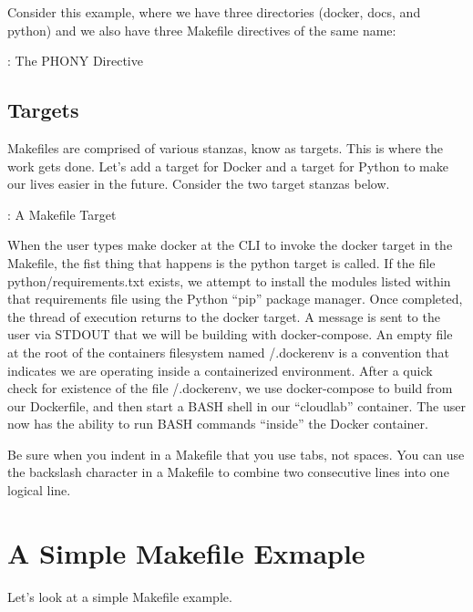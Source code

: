 \justify{}
Consider this example, where we have three directories (docker, docs, and python) and we also have three Makefile directives of the same name:

\begin{mybox}{\thetcbcounter: The PHONY Directive}
	
\end{mybox}

\subsection{Targets}

\justify{}
Makefiles are comprised of various stanzas, know as targets. This is where the work gets done. Let's add a target for Docker and a target for
Python to make our lives easier in the future. Consider the two target stanzas below.

\justify{}
\begin{mybox}{\thetcbcounter: A Makefile Target}
	
\end{mybox}

\justify{}
When the user types make docker at the CLI to invoke the docker target in the Makefile, the fist thing that happens is the python target is
called. If the file python/requirements.txt exists, we attempt to install the modules listed within that requirements file using the
Python ``pip'' package manager. Once completed, the thread of execution returns to the docker target. A message is sent to the user via STDOUT
that we will be building with docker-compose. An empty file at the root of the containers filesystem named /.dockerenv is a convention that
indicates we are operating inside a containerized environment. After a quick check for existence of the file /.dockerenv, we use docker-compose
to build from our Dockerfile, and then start a BASH shell in our ``cloudlab'' container. The user now has the ability to run BASH commands
``inside'' the Docker container.

\justify{}
Be sure when you indent in a Makefile that you use tabs, not spaces. You can use the backslash character in a Makefile to combine two consecutive
lines into one logical line.

\section{A Simple Makefile Exmaple}

\justify{}
Let's look at a simple Makefile example. 

